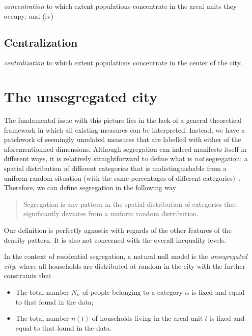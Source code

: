 {\it concentration} to which extent populations
concentrate in the areal units they occupy; and (iv) 

\subsection{Centralization}
\label{sub:centralization}

{\it centralization} to
which extent populations concentrate in the center of the city.\\


\section{The unsegregated city}
\label{sec:null_model_the_unsegregated_city}

The fundamental issue with this picture lies in the lack of a general theoretical framework
in which all existing measures can be interpreted.  Instead, we have a
patchwork of seemingly unrelated measures that are labelled with
either of the aforementionned dimensions. Although segregation can
indeed manifests itself in different ways, it is relatively
straightforward to define what is \emph{not} segregation: a spatial
distribution of different categories that is undistinguishable from a
uniform random situation (with the same percentages of different
categories)~\cite{Jahn:1947}. Therefore, we can define segregation in the following way 

\begin{quote}
Segregation is any pattern in the spatial distribution of categories that significantly 
deviates from a uniform random distribution. 
\end{quote} 

Our definition is perfectly agnostic with regards of the other features of the
density pattern. It is also not concerned with the overall inequality levels. 


In the context of residential segregation, a natural null model is the
\emph{unsegregated city}, where all households are distributed at
random in the city with the further constraints that

\begin{itemize}
    \item The total number $N_\alpha$ of people belonging to a category
	    $\alpha$ is fixed and equal to that found in the data;
    \item The total number $n(t)$ of households living in the areal unit $t$ is
	    fixed and equal to that found in the data.
\end{itemize}

